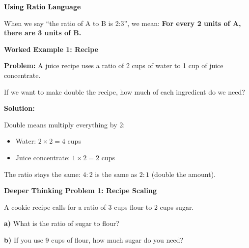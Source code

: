 \documentclass[12pt, letterpaper, fleqn]{article}
\begin{document}
\newpage

\begin{tcolorbox}[colback=customteal!20]
\large\textcolor{black}{\textbf{Using Ratio Language}}
\end{tcolorbox}

\noindent
When we say ``the ratio of A to B is 2:3'', we mean: \textbf{For every 2 units of A, there are 3 units of B.}

\vspace{3mm}

\begin{tcolorbox}[colback=white, colframe=black!25, boxrule=0.6pt, arc=4mm, left=6mm, right=6mm, top=5mm, bottom=5mm]

\textbf{Worked Example 1: Recipe}

\medskip

\textbf{Problem:} A juice recipe uses a ratio of 2 cups of water to 1 cup of juice concentrate.

\noindent
If we want to make double the recipe, how much of each ingredient do we need?

\medskip

\noindent
\textbf{Solution:}

\medskip

\noindent
Double means multiply everything by 2:
\begin{itemize}
    \item Water: $2 \times 2 = 4$ cups
    \item Juice concentrate: $1 \times 2 = 2$ cups
\end{itemize}

\medskip

\noindent
The ratio stays the same: $4:2$ is the same as $2:1$ (double the amount).

\end{tcolorbox}

\vspace{4mm}

\begin{tcolorbox}[colback=yellow!15, colframe=orange, boxrule=1.5pt, arc=4mm, left=6mm, right=6mm, top=5mm, bottom=5mm]

\textbf{Deeper Thinking Problem 1: Recipe Scaling}

\medskip

\noindent
A cookie recipe calls for a ratio of 3 cups flour to 2 cups sugar.

\noindent
\textbf{a)} What is the ratio of sugar to flour?

\vspace{1.5cm}

\noindent
\textbf{b)} If you use 9 cups of flour, how much sugar do you need?

\vspace{1.8cm}

\end{tcolorbox}
\end{document}

